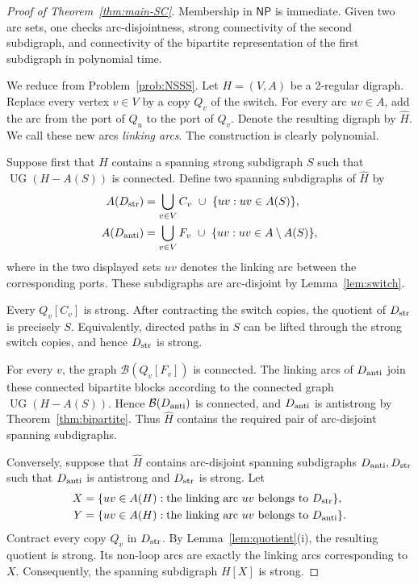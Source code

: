 \documentclass[12pt]{article}
\theoremstyle{remark}
\newcommand{\UG}{\operatorname{UG}}
\newcommand{\cB}{\mathcal{B}}
\newcommand{\NP}{\mathsf{NP}}
\begin{document}
\begin{proof}[Proof of Theorem~\ref{thm:main-SC}]
Membership in $\NP$ is immediate.  Given two arc sets, one checks
arc-disjointness, strong connectivity of the second subdigraph, and
connectivity of the bipartite representation of the first subdigraph
in polynomial time.

We reduce from Problem~\ref{prob:NSSS}.  Let $H=(V,A)$ be a 2-regular
digraph.  Replace every vertex $v\in V$ by a copy $Q_v$ of the switch.
For every arc $uv\in A$, add the arc from the port of $Q_u$ to the port
of $Q_v$.  Denote the resulting digraph by $\widehat H$.  We call these
new arcs \emph{linking arcs}.  The construction is clearly polynomial.

Suppose first that $H$ contains a spanning strong subdigraph $S$ such that $\UG(H-A(S))$ is connected. Define two spanning subdigraphs of $\widehat H$ by
\begin{align*}
 A(D_{\rm str})
   &=
   \bigcup_{v\in V} C_v
   \ \cup\
   \{uv:uv\in A(S)\},\\
 A(D_{\rm anti})
   &=
   \bigcup_{v\in V} F_v
   \ \cup\
   \{uv:uv\in A\setminus A(S)\},
\end{align*}
where in the two displayed sets $uv$ denotes the linking arc between the corresponding ports. These subdigraphs are
arc-disjoint by Lemma~\ref{lem:switch}.

Every $Q_v[C_v]$ is strong.  After contracting the switch copies, the quotient of $D_{\rm str}$ is precisely $S$. Equivalently, directed
paths in $S$ can be lifted through the strong switch copies, and hence $D_{\rm str}$ is strong.

For every $v$, the graph $\cB(Q_v[F_v])$ is connected. The linking arcs of $D_{\rm anti}$ join these connected bipartite blocks according
to the connected graph $\UG(H-A(S))$.  Hence $\cB(D_{\rm anti})$ is connected, and $D_{\rm anti}$ is antistrong by Theorem~\ref{thm:bipartite}.  Thus $\widehat H$ contains the required pair of arc-disjoint spanning subdigraphs.

Conversely, suppose that $\widehat H$ contains arc-disjoint spanning
subdigraphs $D_{\rm anti},D_{\rm str}$ such that $D_{\rm anti}$ is antistrong and $D_{\rm str}$ is strong.  Let
\begin{align*}
 X&=\{uv\in A(H):\text{the linking arc $uv$ belongs to }D_{\rm str}\},\\
 Y&=\{uv\in A(H):\text{the linking arc $uv$ belongs to }D_{\rm anti}\}.
\end{align*}
Contract every copy $Q_v$ in $D_{\rm str}$.  By
Lemma~\ref{lem:quotient}(i), the resulting quotient is strong.  Its non-loop arcs are exactly the linking arcs corresponding to $X$.
Consequently, the spanning subdigraph $H[X]$ is strong.


\end{proof}
\end{document}
